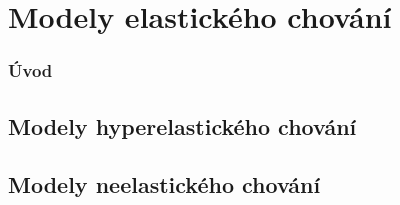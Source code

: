 \chapter{Modely elastického chování}
\subsection{Úvod}







\section{Modely hyperelastického chování}






\section{Modely neelastického chování}




